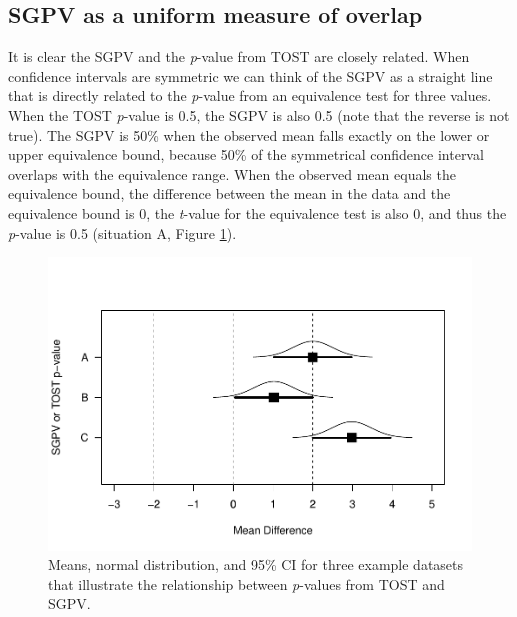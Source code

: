 \documentclass[,man,floatsintext]{apa6}
\begin{document}
\subsection{SGPV as a uniform measure of
overlap}\label{sgpv-as-a-uniform-measure-of-overlap}

It is clear the SGPV and the \emph{p}-value from TOST are closely
related. When confidence intervals are symmetric we can think of the
SGPV as a straight line that is directly related to the \emph{p}-value
from an equivalence test for three values. When the TOST \emph{p}-value
is 0.5, the SGPV is also 0.5 (note that the reverse is not true). The
SGPV is 50\% when the observed mean falls exactly on the lower or upper
equivalence bound, because 50\% of the symmetrical confidence interval
overlaps with the equivalence range. When the observed mean equals the
equivalence bound, the difference between the mean in the data and the
equivalence bound is 0, the \emph{t}-value for the equivalence test is
also 0, and thus the \emph{p}-value is 0.5 (situation A, Figure
\ref{fig:TOSTSGPV3}).

\begin{figure}
\centering
\includegraphics{manuscript.R1_files/figure-latex/TOSTSGPV3-1.pdf}
\caption{\label{fig:TOSTSGPV3}Means, normal distribution, and 95\% CI for
three example datasets that illustrate the relationship between
\emph{p}-values from TOST and SGPV.}
\end{figure}
\end{document}
